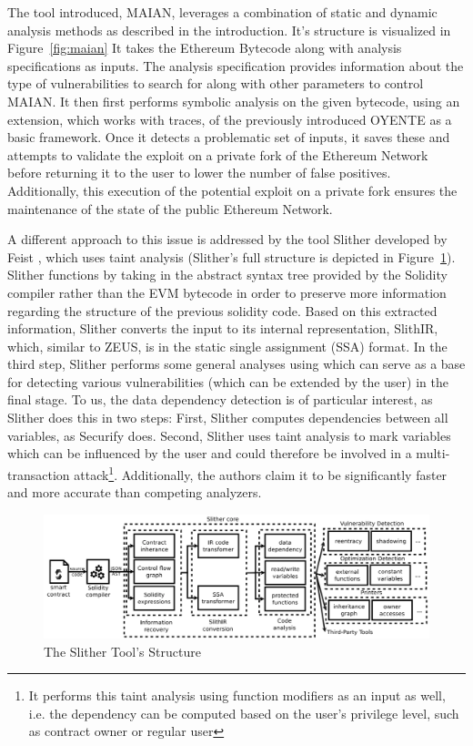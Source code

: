\documentclass[letterpaper,twocolumn,10pt]{article}
\begin{document}
The tool introduced, MAIAN, leverages a combination of static and dynamic analysis methods as described in the introduction. It's structure is visualized in Figure~\ref{fig:maian} It takes the Ethereum Bytecode along with analysis specifications as inputs. The analysis specification provides information about the type of vulnerabilities to search for along with other parameters to control MAIAN. It then first performs symbolic analysis on the given bytecode, using an extension, which works with traces, of the previously introduced OYENTE as a basic framework. Once it detects a problematic set of inputs, it saves these and attempts to validate the exploit on a private fork of the Ethereum Network before returning it to the user to lower the number of false positives. Additionally, this execution of the potential exploit on a private fork ensures the maintenance of the state of the public Ethereum Network.

A different approach to this issue is addressed by the tool Slither developed by Feist \cite{feist_grieco_groce_2019}, which uses taint analysis (Slither's full structure is depicted in Figure~\ref{fig:slither}). Slither functions by taking in the abstract syntax tree provided by the Solidity compiler rather than the EVM bytecode in order to preserve more information regarding the structure of the previous solidity code. Based on this extracted information, Slither converts the input to its internal representation, SlithIR, which, similar to ZEUS, is in the static single assignment (SSA) format. In the third step, Slither performs some general analyses using which can serve as a base for detecting various vulnerabilities (which can be extended by the user) in the final stage. To us, the data dependency detection is of particular interest, as Slither does this in two steps: First, Slither computes dependencies between all variables, as Securify does. Second, Slither uses taint analysis to mark variables which can be influenced by the user and could therefore be involved in a multi-transaction attack\footnote{It performs this taint analysis using function modifiers as an input as well, i.e. the dependency can be computed based on the user's privilege level, such as contract owner or regular user}. Additionally, the authors claim it to be significantly faster and more accurate than competing analyzers.

\begin{figure}
\begin{center}
\includegraphics[scale=0.15]{Slither}
\end{center}
\caption{\label{fig:slither} The Slither Tool's Structure\cite{feist_grieco_groce_2019}}
\end{figure}
\end{document}
